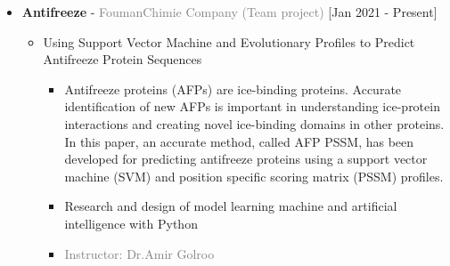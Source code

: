 \documentclass[10pt,a4paper,sans]{moderncv} %
\begin{document}
	\begin{itemize}
		\item {}  \textbf{Antifreeze}  - \textcolor{gray}{FoumanChimie Company}  \hfill\textcolor{gray}{(Team project)}   [Jan 2021 - Present]
		\begin{itemize}
			\item Using Support Vector Machine and Evolutionary Profiles to Predict Antifreeze Protein Sequences 
			\begin{itemize} 
		     	\item Antifreeze proteins (AFPs) are ice-binding proteins. Accurate identification of new AFPs is important in understanding ice-protein interactions and creating novel ice-binding domains in other proteins. In this paper, an accurate method, called AFP PSSM, has been developed for predicting antifreeze proteins using a support vector machine (SVM) and position specific scoring matrix (PSSM) profiles.
		     	\item Research and design of model learning machine and artificial intelligence with Python
				
				
			    
				\item\textcolor{gray}{Instructor: Dr.Amir Golroo}
			\end{itemize}
			
				\newline
			
		\end{itemize}
	\end{itemize}


	\vspace{9.0em}
	
	
	 \vspace{6.5em}
\end{document}
